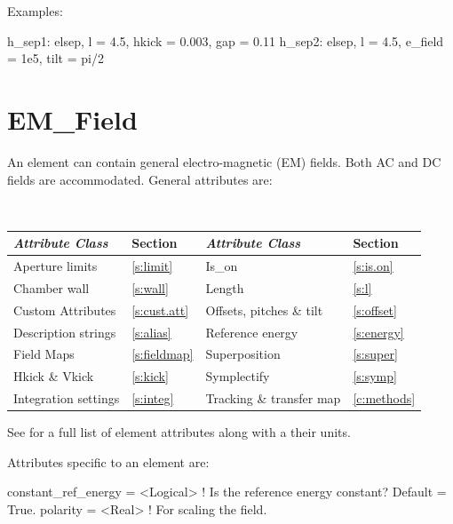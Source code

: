 Examples:
\begin{example}
  h_sep1: elsep, l = 4.5, hkick = 0.003, gap = 0.11
  h_sep2: elsep, l = 4.5, e_field = 1e5, tilt = pi/2
\end{example}

\newpage

\section{EM_Field}
\label{s:em.field}

An  element can contain general electro-magnetic (EM)
fields. Both AC and DC fields are accommodated.  General 
attributes are:
\begin{center}
\tt
\begin{tabular}{llll} \toprule
  {\sl Attribute Class}      & Section           & {\sl Attribute Class}      & Section         \\ \midrule
  Aperture limits            & \ref{s:limit}     & Is_on                      & \ref{s:is.on}   \\
  Chamber wall               & \ref{s:wall}      & Length                     & \ref{s:l}       \\ 
  Custom Attributes          & \ref{s:cust.att}  & Offsets, pitches \& tilt   & \ref{s:offset}  \\
  Description strings        & \ref{s:alias}     & Reference energy           & \ref{s:energy}  \\
  Field Maps                 & \ref{s:fieldmap}  & Superposition              & \ref{s:super}   \\
  Hkick \& Vkick             & \ref{s:kick}      & Symplectify                & \ref{s:symp}    \\
  Integration settings       & \ref{s:integ}     & Tracking \& transfer map   & \ref{c:methods} \\
  \bottomrule
\end{tabular}
\end{center}
\toffset
See  for a full list of element attributes along with a their units.

Attributes specific to an  element are:
\begin{example}
  constant_ref_energy = <Logical> ! Is the reference energy constant? Default = True.
  polarity   = <Real>  ! For scaling the field.
\end{example}

